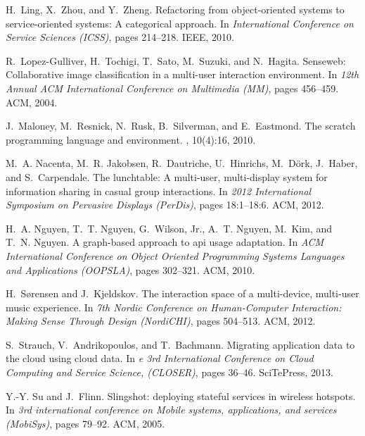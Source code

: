 \documentclass[article]{sigplanconf}
\begin{document}
\begin{thebibliography}{10}
H.~Ling, X.~Zhou, and Y.~Zheng.
\newblock Refactoring from object-oriented systems to service-oriented systems:
  A categorical approach.
\newblock In {\em International Conference on Service Sciences (ICSS)}, pages
  214--218. IEEE, 2010.

R.~Lopez-Gulliver, H.~Tochigi, T.~Sato, M.~Suzuki, and N.~Hagita.
\newblock Senseweb: Collaborative image classification in a multi-user
  interaction environment.
\newblock In {\em 12th Annual ACM International Conference on Multimedia (MM)},
  pages 456--459. ACM, 2004.

J.~Maloney, M.~Resnick, N.~Rusk, B.~Silverman, and E.~Eastmond.
\newblock The scratch programming language and environment.
, 10(4):16, 2010.

M.~A. Nacenta, M.~R. Jakobsen, R.~Dautriche, U.~Hinrichs, M.~D\"{o}rk,
  J.~Haber, and S.~Carpendale.
\newblock The lunchtable: A multi-user, multi-display system for information
  sharing in casual group interactions.
\newblock In {\em 2012 International Symposium on Pervasive Displays (PerDis)},
  pages 18:1--18:6. ACM, 2012.

H.~A. Nguyen, T.~T. Nguyen, G.~Wilson, Jr., A.~T. Nguyen, M.~Kim, and T.~N.
  Nguyen.
\newblock A graph-based approach to api usage adaptation.
\newblock In {\em ACM International Conference on Object Oriented Programming
  Systems Languages and Applications (OOPSLA)}, pages 302--321. ACM, 2010.

H.~S{\o}rensen and J.~Kjeldskov.
\newblock The interaction space of a multi-device, multi-user music experience.
\newblock In {\em 7th Nordic Conference on Human-Computer Interaction: Making
  Sense Through Design (NordiCHI)}, pages 504--513. ACM, 2012.

S.~Strauch, V.~Andrikopoulos, and T.~Bachmann.
\newblock Migrating application data to the cloud using cloud data.
\newblock In {\em e 3rd International Conference on Cloud Computing and Service
  Science, (CLOSER)}, pages 36--46. SciTePress, 2013.

Y.-Y. Su and J.~Flinn.
\newblock Slingshot: deploying stateful services in wireless hotspots.
\newblock In {\em 3rd international conference on Mobile systems, applications,
  and services (MobiSys)}, pages 79--92. ACM, 2005.


\end{thebibliography}
\end{document}
